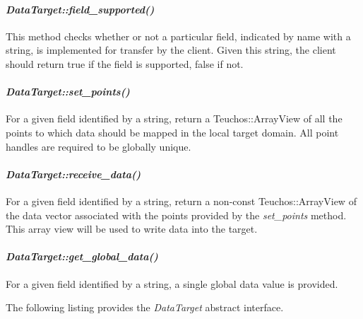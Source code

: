 \documentclass[letterpaper]{article}
\begin{document}
\paragraph{\sl DataTarget::field\_supported()}
This method checks whether or not a particular field, indicated by
name with a string, is implemented for transfer by the client. Given
this string, the client should return true if the field is supported,
false if not.

\paragraph{\sl DataTarget::set\_points()}
For a given field identified by a string, return a Teuchos::ArrayView
of all the points to which data should be mapped in the local target
domain. All point handles are required to be globally unique.

\paragraph{\sl DataTarget::receive\_data()}
For a given field identified by a string, return a non-const
Teuchos::ArrayView of the data vector associated with the points
provided by the {\sl set\_points} method. This array view will be used
to write data into the target.

\paragraph{\sl DataTarget::get\_global\_data()}
For a given field identified by a string, a single global data value
is provided.

The following listing provides the {\sl DataTarget} abstract
interface. 
\end{document}
